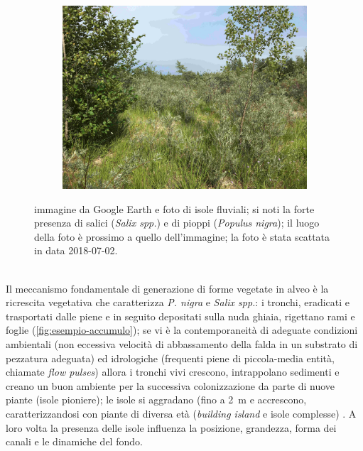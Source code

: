 \begin{figure}
\begin{subfigure}[b]{0.57\textwidth}
		\includegraphics[width=\textwidth]{files/esempio_isola_1.jpg}
	\end{subfigure}
	\caption[immagine e foto di isole fluviali]{immagine da Google Earth e foto di isole fluviali; si noti la forte presenza di salici (\emph{Salix spp.}) e di pioppi (\emph{Populus nigra}); il luogo della foto è prossimo a quello dell'immagine; la foto è stata scattata in data 2018-07-02.}
	\label{fig:esempio-isola}
\end{figure}
%
\\
Il meccanismo fondamentale di generazione di forme vegetate in alveo è la ricrescita vegetativa che caratterizza \emph{P. nigra} e \emph{Salix spp.}: i tronchi, eradicati e trasportati dalle piene e in seguito depositati sulla nuda ghiaia, rigettano rami e foglie (\cref{fig:esempio-accumulo});
se vi è la contemporaneità di adeguate condizioni ambientali (non eccessiva velocità di abbassamento della falda in un substrato di pezzatura adeguata) ed idrologiche (frequenti piene di piccola-media entità, chiamate \emph{flow pulses}) allora i tronchi vivi crescono, intrappolano sedimenti e creano un buon ambiente per la successiva colonizzazione da parte di nuove piante (isole pioniere);
le isole si aggradano (fino a \SI{2}{\m}  e accrescono, caratterizzandosi con piante di diversa età (\emph{building island} e isole complesse) .
A loro volta la presenza delle isole influenza la posizione, grandezza, forma dei canali e le dinamiche del fondo.
%
